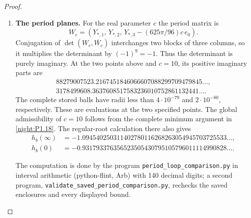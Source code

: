 \begin{proof}
\begin{enumerate}[label={$\langle1\rangle$\arabic*.}]
\item \textbf{The period planes.}
For the real parameter $c$ the period matrix is
\[
 W_c=(Y_{*,1},\,Y_{*,2},\,Y_{*,3}-(625\pi/96)c\,e_0).
\]
Conjugation of $\det(W_c,\overline{W_c})$ interchanges two blocks
of three columns, so it multiplies the determinant by $(-1)^9=-1$.
Thus the determinant is purely imaginary.  At the two points above
and $c=10$, its positive imaginary parts are
\[
\begin{gathered}
 88279007523.2167451846066607088299709479845\ldots,\\
 3178499608.3637608517583236010752861132441\ldots .
\end{gathered}
\]
The complete stored balls have radii less than $4\cdot10^{-79}$
and $2\cdot10^{-80}$, respectively.  These are evaluations at the
two specified points.  The global admissibility of $c=10$ follows
from the complete minimum argument in \cref{night:P1.18}.  The regular-root
calculation there also gives
\[
\begin{split}
 h_b(\infty)&=-1.094540250311402780116268263054945703725533\ldots,\\
 h_b(0)&=-0.931793376356523505430795105796011114990828\ldots .
\end{split}
\]

The computation is done by the program \texttt{period\_loop\_comparison.py} in interval arithmetic (python-flint, Arb) with 140 decimal digits; a second program, \texttt{validate\_saved\_period\_comparison.py}, rechecks the saved enclosures and every displayed bound.
\end{enumerate}
\end{proof}
